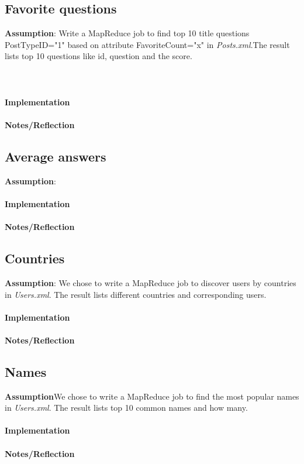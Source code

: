 \documentclass[fleqn,10pt]{wlscirep}
\begin{document}
\subsection{Favorite questions }
\textbf{Assumption}: Write a MapReduce job to find top 10 title questions PostTypeID="1"  based on attribute FavoriteCount="x" in \textit{Posts.xml}.The result lists top 10 questions like id, question and the score.\\ \\ \\ \\
\textbf{Implementation}  \\ \\
\textbf{Notes/Reflection}


\subsection{Average answers}
\textbf{Assumption}: \\ \\
\textbf{Implementation}  \\ \\
\textbf{Notes/Reflection}


\subsection{Countries }
\textbf{Assumption}: We chose to write a MapReduce job to discover users by countries in \textit{Users.xml}. The result lists different countries and corresponding users. \\ \\
\textbf{Implementation}  \\ \\
\textbf{Notes/Reflection}


\subsection{Names}
\textbf{Assumption}We chose to write a MapReduce job to find the most popular names in \textit{Users.xml}. The result lists top 10 common names and how many.  \\ \\
\textbf{Implementation}  \\ \\
\textbf{Notes/Reflection}

\end{document}
